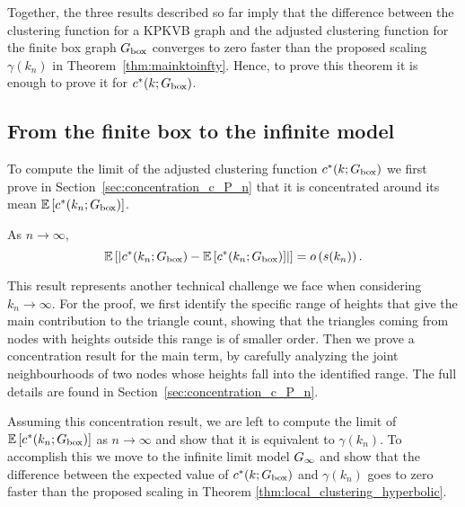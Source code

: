 Together, the three results described so far imply that the difference between the clustering function for a KPKVB graph and the adjusted clustering function for the finite box graph $G_{\text{box}}$ converges to zero faster than the proposed scaling $\gamma(k_n)$ in Theorem~\ref{thm:mainktoinfty}. Hence, to prove this theorem it is enough to prove it for $c^\ast(k; G_{\text{box}})$. 

\subsection{From the finite box to the infinite model}

To compute the limit of the adjusted clustering function $c^\ast(k; G_{\text{box}})$ we first prove in Section~\ref{sec:concentration_c_P_n} that it is concentrated around its mean $\mathbb{E}\left[c^\ast(k_n; G_{\text{box}})\right]$.


\begin{proposition}\label{prop:concentration_local_clustering_P_n}
As $n \to \infty$,
\[
	\mathbb{E}\left[\left|c^\ast(k_n; G_{\text{box}}) - \mathbb{E}\left[c^\ast(k_n; G_{\text{box}})\right]\right|\right] = o\left(s(k_n)\right).
\]
\end{proposition}

This result represents another technical challenge we face when considering $k_n \to \infty$. For the proof, we first identify the specific range of heights that give the main contribution to the triangle count, showing that the triangles coming from nodes with heights outside this range is of smaller order. Then we prove a concentration result for the main term, by carefully analyzing the joint neighbourhoods of two nodes whose heights fall into the identified range. The full details are found in Section~\ref{sec:concentration_c_P_n}.

Assuming this concentration result, we are left to compute the limit of $\mathbb{E}\left[c^\ast(k_n; G_{\text{box}})\right]$ as $n \to \infty$ and show that it is equivalent to $\gamma(k_n)$. To accomplish this we move to the infinite limit model $G_{\infty}$ and show that the difference between the expected value of $c^\ast(k;G_{\text{box}})$ and $\gamma(k_n)$ goes to zero faster than the proposed scaling in Theorem \ref{thm:local_clustering_hyperbolic}.

